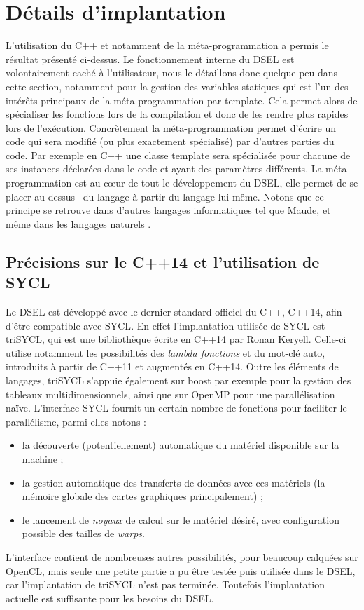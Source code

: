 \section{Détails d'implantation}

L'utilisation du \textsf{C++} et notamment de la méta-programmation a permis le résultat présenté ci-dessus. Le fonctionnement interne du DSEL est volontairement caché à l'utilisateur, nous le détaillons donc quelque peu dans cette section, notamment pour la gestion des variables statiques qui est l'un des intérêts principaux de la méta-programmation par template. Cela permet alors de spécialiser les fonctions lors de la compilation et donc de les rendre plus rapides lors de l'exécution. Concrètement la méta-programmation permet d'écrire un code qui sera modifié (ou plus exactement spécialisé) par d'autres parties du code. Par exemple en \textsf{C++} une classe template sera spécialisée pour chacune de ses instances déclarées dans le code et ayant des paramètres différents. La méta-programmation est au cœur de tout le développement du DSEL, elle permet de se placer \og au-dessus \fg~du langage à partir du langage lui-même. Notons que ce principe se retrouve dans d'autres langages informatiques tel que \textsf{Maude}, et même dans les langages naturels \cite{Web6}.

\subsection{Précisions sur le \textsf{C++14} et l'utilisation de \textsf{SYCL}}

Le DSEL est développé avec le dernier standard officiel du \textsf{C++}, \textsf{C++14}, afin d'être compatible avec \textsf{SYCL}. En effet l'implantation utilisée de \textsf{SYCL} est \textsf{triSYCL}, qui est une bibliothèque écrite en \textsf{C++14} par Ronan Keryell. Celle-ci utilise notamment les possibilités des \emph{lambda fonctions} et du mot-clé \textsf{auto}, introduits à partir de \textsf{C++11} et augmentés en \textsf{C++14}. Outre les éléments de langages, \textsf{triSYCL} s'appuie également sur \textsf{boost} par exemple pour la gestion des tableaux multidimensionnels, ainsi que sur \textsf{OpenMP} pour une parallélisation naïve. L'interface \textsf{SYCL} fournit un certain nombre de fonctions pour faciliter le parallélisme, parmi elles notons :
\begin{itemize} 
\item la découverte (potentiellement) automatique du matériel disponible sur la machine ;
\item la gestion automatique des transferts de données avec ces matériels (la mémoire globale des cartes graphiques principalement) ;
\item le lancement de \emph{noyaux} de calcul sur le matériel désiré, avec configuration possible des tailles de \emph{warps}.
\end{itemize}
L'interface contient de nombreuses autres possibilités, pour beaucoup calquées sur \textsf{OpenCL}, mais seule une petite partie a pu être testée puis utilisée dans le DSEL, car l'implantation de \textsf{triSYCL} n'est pas terminée. Toutefois l'implantation actuelle est suffisante pour les besoins du DSEL.

